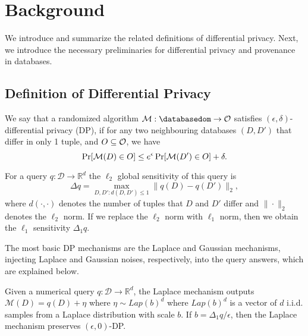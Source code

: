 \section{Background}

We introduce and summarize the related definitions of differential privacy.
Next, we introduce the necessary preliminaries for differential privacy and provenance in databases.

\subsection{Definition of Differential Privacy}

\begin{definition}

We say that a randomized algorithm $\mc{M}: \databasedom \rightarrow  \mc{O}$ 
satisfies $(\epsilon, \delta)$-differential privacy (DP), if for any two
neighbouring databases $(D,D')$ that differ in only 1 tuple, 
and $O\subseteq \mathcal{O}$, we have
$$
\Pr[\mathcal{M}(D) \in O] \leq e^\epsilon \Pr[\mathcal{M}(D') \in O] + \delta.
$$
\end{definition}

\begin{definition}
For a query $q: \mathcal{D} \rightarrow \mathbb{R}^d$ 
the $\ell_2$ global sensitivity of this query is 
$$
\Delta q = \max_{D, D': d(D,D') \leq 1} \| q(D) - q(D') \|_2,
$$ 
where $d(\cdot, \cdot)$ denotes the number of tuples that $D$ and $D'$ differ and $\| \cdot \|_2$ denotes the $\ell_2$ norm. If we replace the $\ell_2$ norm with $\ell_1$ norm, then we obtain the $\ell_1$ sensitivity $\Delta_1 q$.
\end{definition}



 The most basic DP mechanisms are the Laplace and Gaussian mechanisms, injecting Laplace and Gaussian noises, respectively, into the query answers, which are explained below.

\begin{definition}
    Given a numerical query $q: \mathcal{D} \rightarrow \mathbb{R}^d$, the Laplace mechanism outputs $\mathcal{M}(D) = q(D) + \eta$  where 
$\eta \sim {Lap} \left( b \right)^d$ where ${Lap} \left( b \right)^d$ is a vector of $d$ i.i.d. samples from a Laplace distribution with scale $b$. If $b=\Delta_1 q/\epsilon$, then the Laplace mechanism preserves $(\epsilon, 0)$-DP.
\end{definition}

